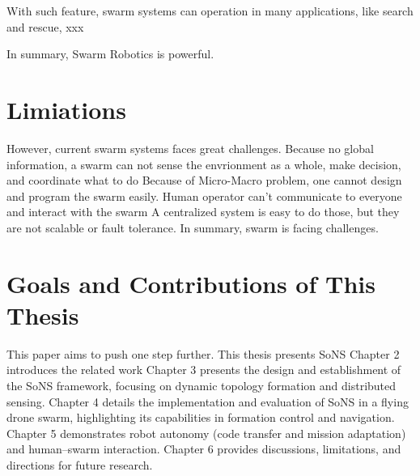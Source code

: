With such feature, swarm systems can operation in many applications, like search and rescue, xxx

In summary, Swarm Robotics is powerful.


\section{Limiations}


However, current swarm systems faces great challenges.
Because no global information, a swarm can not sense the envrionment as a whole, make decision, and coordinate what to do
Because of Micro-Macro problem, one cannot design and program the swarm easily.
Human operator can't communicate to everyone and interact with the swarm
A centralized system is easy to do those, but they are not scalable or fault tolerance.
In summary, swarm is facing challenges.

\section{Goals and Contributions of This Thesis}

This paper aims to push one step further.
This thesis presents SoNS
Chapter 2 introduces the related work
Chapter 3 presents the design and establishment of the SoNS framework, focusing on dynamic topology formation and distributed sensing.
Chapter 4 details the implementation and evaluation of SoNS in a flying drone swarm, highlighting its capabilities in formation control and navigation.
Chapter 5 demonstrates robot autonomy (code transfer and mission adaptation) and human–swarm interaction.
Chapter 6 provides discussions, limitations, and directions for future research.

